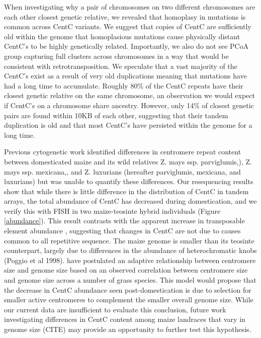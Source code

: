 When investigating why a pair of chromosomes on two different chromosomes are each other closest genetic relative, we revealed that homoplasy in mutations is common across CentC variants.  We suggest that copies of CentC are sufficiently old within the genome that homoplasious mutations cause physically distant CentC’s to be highly genetically related.  Importantly, we also do not see PCoA group capturing full clusters across chromosomes in a way that would be consistent with retrotransposition. We speculate that a vast majority of the CentC’s exist as a result of very old duplications meaning that mutations have had a long time to accumulate. Roughly 80\% of the CentC repeats have their closest genetic relative on the same chromosome, an observation we would expect if CentC’s on a chromosome share ancestry.  However, only 14\% of closest genetic pairs are found within 10KB of each other, suggesting that their tandem duplication is old and that most CentC’s have persisted within the genome for a long time. 

  Previous cytogenetic work  identified  differences in centromere repeat content  between domesticated maize and its wild relatives Z. mays ssp. parviglumis,), Z. mays ssp. mexicana,, and Z. luxurians (hereafter parviglumis, mexicana, and luxurians) \citep{Albert2010} but was unable to quantify these differences. Our resequencing results show that while there is little difference in the distribution of CentC in tandem arrays, the total abundance of CentC has  decreased   during domestication, and we verify this with FISH in two maize-teosinte hybrid individuals (Figure \ref{abundance}). This result contrasts with the apparent increase in transposable element abundance  \citep{Chia2012}, suggesting that changes in CentC are not due to causes common to all repetitive sequence.  The maize genome is smaller than its teosinte counterpart, largely due to differences in the abundance of heterochromatic knobs (Poggio et al 1998).  \citet{Zhang2012} have postulated an adaptive relationship between centromere size and genome size based on an observed correlation between centromere size and genome size across a number of grass species.  This model would propose that the decrease in CentC abundance seen post-domestication is due to selection for smaller active centromeres to complement the smaller overall genome size.  While our current data are insufficient to evaluate this conclusion, future work investigating differences in CentC content among maize landraces that vary in genome size (CITE) may provide an opportunity to further test this hypothesis.  



